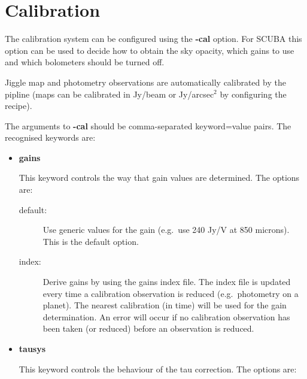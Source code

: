 \documentclass[twoside,11pt,nolof]{starlink}
\begin{document}
\section{Calibration\label{sec:cal}}

The calibration system can be configured using the \textbf{-cal} option.
For SCUBA this option can be used to decide how to obtain the sky opacity,
which gains to use and which bolometers should be turned off.

Jiggle map and photometry observations are automatically calibrated
by the pipline (maps can be calibrated in Jy/beam or Jy/arcsec$^2$
by configuring the recipe).

The arguments to \textbf{-cal} should be comma-separated
keyword=value pairs. The recognised keywords are:

\begin{itemize}
\item \textbf{gains} \mbox{}

This keyword controls the way that gain values are determined. The options
are:

\begin{description}
\item[default:] Use generic values for the gain (e.g.\ use 240 Jy/V at 850
microns). This is the default option.
\item[index:] Derive gains by using the gains index file. The index file
is updated every time a calibration observation is reduced (e.g.\ photometry
on a planet). The nearest calibration (in
time) will be used for the gain determination. An error will occur if
no calibration observation has been taken (or reduced) before an observation
is reduced.
\end{description}


\item \textbf{tausys} \mbox{}

This keyword controls the behaviour of the tau correction. The options
are:


\end{itemize}
\end{document}
